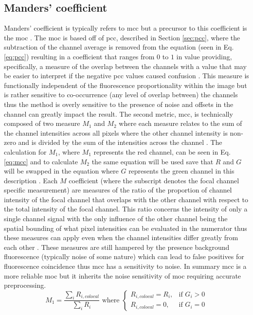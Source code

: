 \subsection{Manders' coefficient}\label{sec:mc}
Manders' coefficient is typically refers to \gls{mcc} but a precursor to this coefficient is the \gls{moc} \cite{practical_guide_coloc}. The \gls{moc} is based off of \gls{pcc}, described in Section \ref{sec:pcc}, where the subtraction of the channel average is removed from the equation (seen in Eq. \ref{eq:pcc}) resulting in a coefficient that ranges from $0$ to $1$ in value providing, specifically, a measure of the overlap between the channels \cite{Manders} with a value that may be easier to interpret if the negative \gls{pcc} values caused confusion \cite{practical_guide_coloc}. This measure is functionally independent of the fluorescence proportionality within the image but is rather sensitive to co-occurrence (any level of overlap between) the channels thus the method is overly sensitive to the presence of noise and offsets in the channel can greatly impact the result. The second metric, \gls{mcc}, is technically composed of two measure $M_1$ and $M_2$ where each measure relates to the sum of the channel intensities across all pixels where the other channel intensity is non-zero and is divided by the sum of the intensities across the channel \cite{Manders}. The calculation for $M_1$, where $M_1$ represents the red channel, can be seen in Eq. \ref{eq:mcc} and to calculate $M_2$ the same equation will be used save that $R$ and $G$ will be swapped in the equation where $G$ represents the green channel in this description \cite{practical_guide_coloc, Manders}. Each $M$ coefficient (where the subscript denotes the focal channel specific measurement) are measures of the ratio of the proportion of channel intensity of the focal channel that overlaps with the other channel with respect to the total intensity of the focal channel. This ratio concerns the intensity of only a single channel signal with the only influence of the other channel being the spatial bounding of what pixel intensities can be evaluated in the numerator thus these measures can apply even when the channel intensities differ greatly from each other \cite{Manders}. These measures are still hampered by the presence background fluorescence (typically noise of some nature) which can lead to false positives for fluorescence coincidence thus \gls{mcc} has a sensitivity to noise. In summary \gls{mcc} is a more reliable \gls{moc} but it inherits the noise sensitivity of \gls{moc} requiring accurate preprocessing.
\begin{equation}\label{eq:mcc}
    M_1 = \frac{\sum_i R_{i,colocal}}{\sum_i R_i} \text{ where }
    \begin{cases}
    R_{i,colocal}=R_i,& \text{if } G_i>0\\
    R_{i,colocal}=0,& \text{if } G_i=0
    \end{cases}
\end{equation}

